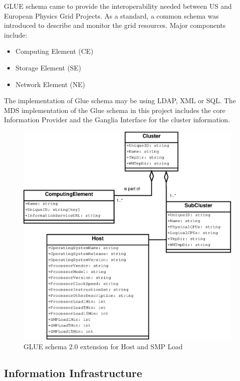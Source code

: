 GLUE schema came to provide the interoperability needed between US and European Physics Grid Projects. As a standard, a common schema was introduced to describe and monitor the grid resources. Major components include:

\begin{itemize}
\item Computing Element (CE)
\item Storage Element (SE)
\item Network Element (NE)
\end{itemize}

The implementation of Glue schema may be using LDAP, XML or SQL. The MDS implementation of the Glue schema in this project includes the core Information Provider and the Ganglia Interface for the cluster information.


\begin{figure}[htb]
\centering
 \includegraphics[width=130mm]{images/gluece_ext.eps}
\caption{GLUE schema 2.0 extension for Host and SMP Load}
\label{figure:gluece_ext}
\end{figure}


\subsection{Information Infrastructure}

